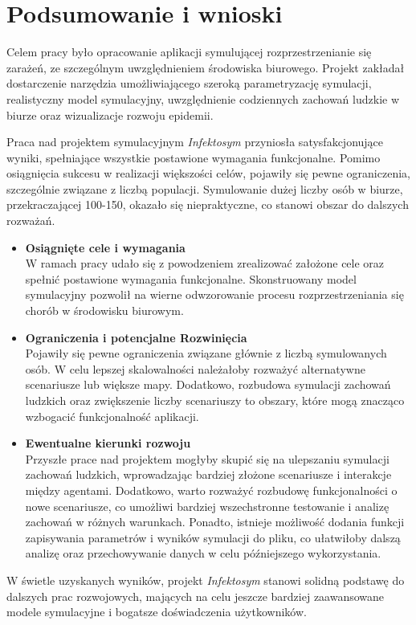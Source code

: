 \chapter*{Podsumowanie i wnioski}
\label{Podsumowanie i wnioski}
Celem pracy było opracowanie aplikacji symulującej rozprzestrzenianie się zarażeń, ze szczególnym uwzględnieniem środowiska biurowego. Projekt zakładał dostarczenie narzędzia umożliwiającego szeroką parametryzację symulacji, realistyczny model symulacyjny, uwzględnienie codziennych zachowań ludzkie w biurze oraz wizualizacje rozwoju epidemii.

Praca nad projektem symulacyjnym \textit{Infektosym} przyniosła satysfakcjonujące wyniki, spełniające wszystkie postawione wymagania funkcjonalne. Pomimo osiągnięcia sukcesu w realizacji większości celów, pojawiły się pewne ograniczenia, szczególnie związane z liczbą populacji. Symulowanie dużej liczby osób w biurze, przekraczającej 100-150, okazało się niepraktyczne, co stanowi obszar do dalszych rozważań.

\begin{itemize}
	\item \textbf{Osiągnięte cele i wymagania} \\
	 W ramach pracy udało się z powodzeniem zrealizować założone cele oraz spełnić postawione wymagania funkcjonalne. Skonstruowany model symulacyjny pozwolił na wierne odwzorowanie procesu rozprzestrzeniania się chorób w środowisku biurowym.
	
	\item \textbf{Ograniczenia i potencjalne Rozwinięcia} \\
	 Pojawiły się pewne ograniczenia związane głównie z liczbą symulowanych osób. W celu lepszej skalowalności należałoby rozważyć alternatywne scenariusze lub większe mapy. Dodatkowo, rozbudowa symulacji zachowań ludzkich oraz zwiększenie liczby scenariuszy to obszary, które mogą znacząco wzbogacić funkcjonalność aplikacji.
	
	\item \textbf{Ewentualne kierunki rozwoju} \\
	 Przyszłe prace nad projektem mogłyby skupić się na ulepszaniu symulacji zachowań ludzkich, wprowadzając bardziej złożone scenariusze i interakcje między agentami. Dodatkowo, warto rozważyć rozbudowę funkcjonalności o nowe scenariusze, co umożliwi bardziej wszechstronne testowanie i analizę zachowań w różnych warunkach. Ponadto, istnieje możliwość dodania funkcji zapisywania parametrów i wyników symulacji do pliku, co ułatwiłoby dalszą analizę oraz przechowywanie danych w celu późniejszego wykorzystania.
\end{itemize}

W świetle uzyskanych wyników, projekt \textit{Infektosym} stanowi solidną podstawę do dalszych prac rozwojowych, mających na celu jeszcze bardziej zaawansowane modele symulacyjne i bogatsze doświadczenia użytkowników. 
